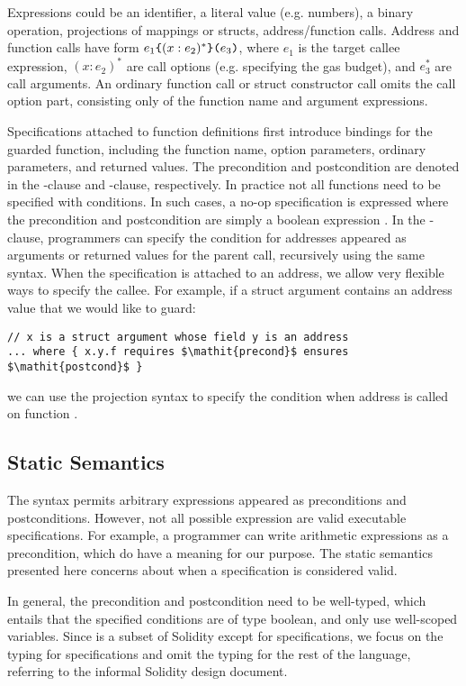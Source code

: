Expressions could be an identifier, a literal value (e.g. numbers), a binary
operation, projections of mappings or structs, address/function calls.
Address and function calls have form ${e_1}\texttt{\{}{(x: e_2)^*}\texttt{\}(}{e_3}\texttt{)}$,
where $e_1$ is the target callee expression,
$(x: e_2)^*$ are call options (e.g. specifying the gas budget),
and $e_3^*$ are call arguments.
An ordinary function call or struct constructor call omits the call option
part, consisting only of the function name and argument expressions.

Specifications attached to function definitions first introduce bindings for
the guarded function, including the function name, option parameters,
ordinary parameters, and returned values.
The precondition and postcondition are denoted in the -clause and
-clause, respectively.
In practice not all functions need to be specified with conditions.
In such cases, a no-op specification is expressed where the precondition and
postcondition are simply a boolean expression .
In the -clause, programmers can specify the condition for addresses
appeared as arguments or returned values for the parent call, recursively using
the same syntax.
When the specification is attached to an address, we allow very flexible ways
to specify the callee. For example, if a struct argument contains an address
value that we would like to guard:
\begin{lstlisting}
// x is a struct argument whose field y is an address
... where { x.y.f requires $\mathit{precond}$ ensures $\mathit{postcond}$ }
\end{lstlisting}
we can use the projection syntax to specify
the condition when address  is called on function .

\subsection{Static Semantics}

The syntax permits arbitrary expressions appeared as preconditions and
postconditions.
However, not all possible expression are valid executable specifications.
For example, a programmer can write arithmetic expressions  as a precondition,
which do have a meaning for our purpose.
The static semantics presented here concerns about when a specification is
considered valid.

In general, the precondition and postcondition need to be well-typed, which
entails that the specified conditions are of type boolean, and only
use well-scoped variables.
Since \corelang is a subset of Solidity except for specifications, we focus on
the typing for specifications and omit the typing for the rest of the language,
referring to the informal Solidity design document.

